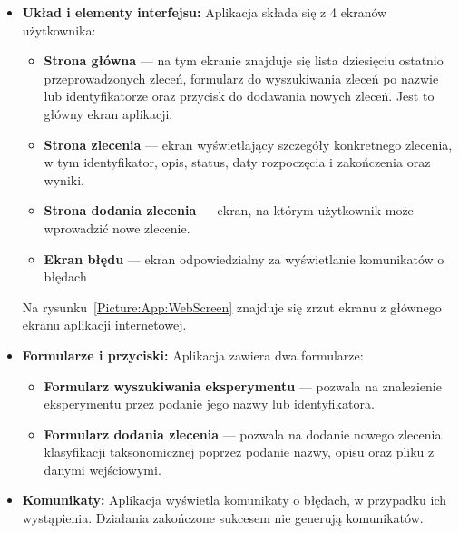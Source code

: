                 \begin{itemize}
                    \item {
                        \textbf{Układ i elementy interfejsu:}
                        Aplikacja składa się z 4 ekranów użytkownika:
                        \begin{itemize}
                            \item {
                                \textbf{Strona główna} — na tym ekranie znajduje się lista dziesięciu ostatnio przeprowadzonych zleceń, formularz do wyszukiwania zleceń po nazwie lub identyfikatorze oraz przycisk do dodawania nowych zleceń. Jest to główny ekran aplikacji.
                                }
                            \item {
                                \textbf{Strona zlecenia} — ekran wyświetlający szczegóły konkretnego zlecenia, w tym identyfikator, opis, status, daty rozpoczęcia i zakończenia oraz wyniki.
                            }
                            \item {
                                \textbf{Strona dodania zlecenia} — ekran, na którym użytkownik może wprowadzić nowe zlecenie. 
                            }
                            \item {
                                \textbf{Ekran błędu} — ekran odpowiedzialny za wyświetlanie komunikatów o błędach
                            }
                        \end{itemize}
                        Na rysunku~\ref{Picture:App:WebScreen} znajduje się zrzut ekranu z głównego ekranu aplikacji internetowej.
                    }
                    \item {
                        \textbf{Formularze i przyciski:}
                        Aplikacja zawiera dwa formularze:
                        \begin{itemize}
                            \item {
                                \textbf{Formularz wyszukiwania eksperymentu} — pozwala na znalezienie eksperymentu przez podanie jego nazwy lub identyfikatora.
                            }
                            \item {
                                \textbf{Formularz dodania zlecenia} — pozwala na dodanie nowego zlecenia klasyfikacji taksonomicznej poprzez podanie nazwy, opisu oraz pliku z danymi wejściowymi.
                            }
                        \end{itemize}
                    }
                    \item {
                        \textbf{Komunikaty:}
                        Aplikacja wyświetla komunikaty o błędach, w przypadku ich wystąpienia. Działania zakończone sukcesem nie generują komunikatów.
                    }
                \end{itemize}

